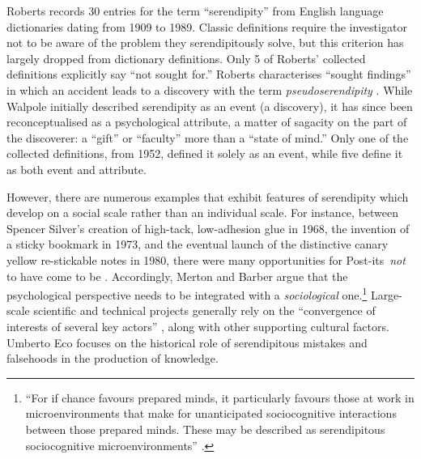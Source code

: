 Roberts \citeyear[pp. 246--249]{roberts} records 30 entries for the term ``serendipity'' from English language dictionaries dating from 1909 to 1989.  
%
Classic definitions require the investigator not to be aware of the problem they serendipitously solve, but this criterion has largely dropped from dictionary definitions. Only 5 of Roberts' collected definitions explicitly say ``not sought for.''  Roberts characterises ``sought findings'' in which an accident leads to a discovery with the term \emph{pseudoserendipity} \cite{chumaceiro1995serendipity}.
%
While Walpole initially described serendipity as an event (a discovery), it has since been reconceptualised as a psychological attribute, a matter of sagacity on the part of the discoverer: a ``gift'' or ``faculty'' more than a ``state of mind.''  Only one of the collected definitions, from 1952, defined it solely as an event, while five define it as both event and attribute.

However, there are numerous examples that exhibit features of
serendipity which develop on a social scale rather than an individual
scale.  For instance, between Spencer Silver's creation of high-tack,
low-adhesion glue in 1968, the invention of a sticky bookmark in 1973,
and the eventual launch of the distinctive canary yellow re-stickable
notes in 1980, there were many opportunities for
Post-its\texttrademark\ \emph{not} to have come to be
\cite{tce-postits}. Accordingly, Merton and Barber argue that the
psychological perspective needs to be integrated with a
\emph{sociological} one.\footnote{ ``For if chance favours prepared
  minds, it particularly favours those at work in microenvironments
  that make for unanticipated sociocognitive interactions between
  those prepared minds. These may be described as serendipitous
  sociocognitive microenvironments'' \cite[p. 259--260]{merton}.}
Large-scale scientific and technical projects generally rely on the
``convergence of interests of several key actors''
\cite{companions-in-geography}, along with other supporting cultural
factors.  Umberto Eco \citeyear{eco2013serendipities} focuses on the
historical role of serendipitous mistakes and falsehoods in the
production of knowledge.

